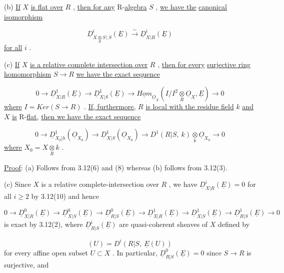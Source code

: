 (b)  \underline{If}  $X$  \underline{is flat over}  $R$ , \underline{then for any} R-\underline{algebra}  $S$ , \underline{we have the} \underline{canonical isomorphism}

\begin{equation*}
\underline{D}^i_{X\underset{R}{\otimes}S\,|\,S}(\underline{E}) \overset{\sim}{\to} \underline{D}^i_{X|R}(\underline{E})
\end{equation*}
\underline{for all}  $i$ .

(c)  \underline{If}  $X$  \underline{is a relative complete intersection over}  $R$ , \underline{then for every} \underline{surjective ring homomorphism}  $S \to R$  \underline{we have the exact sequence}

\begin{equation*}
0 \to \underline{D}^1_{X|R}(\underline{E}) \to \underline{D}^1_{X|S}(\underline{E}) \to \underline{Hom}_{\underline{O}_X}(I/I^2\underset{R}{\otimes}\underline{O}_X, \underline{E}) \to 0
\end{equation*}
\underline{where}  $I = Ker(S \to R)$ . \underline{If, furthermore,}  $R$  \underline{is local with the residue field}  $k$ \underline{and}  $X$  \underline{is} R-\underline{flat,} \underline{then we have the exact sequence}

\begin{equation*}
0 \to \underline{D}^1_{X_0|h}(\underline{O}_{X_0}) \to \underline{D}^1_{X|S}(\underline{O}_{X_0}) \to D^1(R|S,\ k)\underset{k}{\otimes}\underline{O}_{X_0} \to 0
\end{equation*}
\underline{where}  $X_0 = X\underset{R}{\otimes}k$ .

\underline{Proof}:  (a)  Follows from 3.12(6) and (8) whereas (b) follows from 3.12(3).

(c)  Since  $X$  is a relative complete-intersection over  $R$ , we have $\underline{D}^i_{X|R}(\underline{E}) = 0$  for all  $i \geq 2$  by 3.12(10) and hence

\begin{equation*}
0 \to \underline{D}^0_{X|R}(\underline{E}) \to \underline{D}^0_{X|S}(\underline{E}) \to \underline{D}^0_{R|S}(\underline{E}) \to \underline{D}^1_{X|R}(\underline{E}) \to \underline{D}^1_{X|S}(\underline{E}) \to \underline{D}^1_{R|S}(\underline{E}) \to 0
\end{equation*}
is exact by 3.12(2), where  $\underline{D}^i_{R|S}(\underline{E})$  are quasi-coherent sheaves of  $X$  defined by

\begin{equation*}
[\underline{D}^i_{R|S}(\underline{E})](U) = D^i(R|S,\ \underline{E}(U))
\end{equation*}
for every affine open subset  $U \subset X$ . In particular,  $\underline{D}^0_{R|S}(\underline{E}) = 0$  since  $S \to R$ is surjective, and

